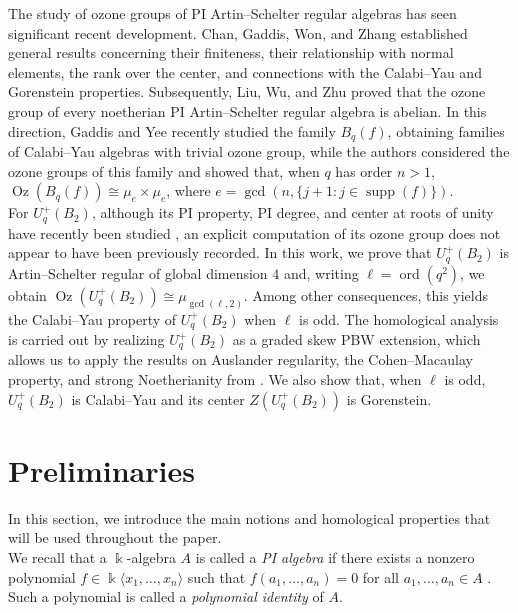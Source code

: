 \documentclass[11pt]{article}
\theoremstyle{definition}
\newcommand{\K}{\Bbbk}
\begin{document}
The study of ozone groups of PI Artin--Schelter regular algebras has seen significant recent development. Chan, Gaddis, Won, and Zhang
\cite{ChanGaddisWonZhang2025} established general results concerning their
finiteness, their relationship with normal elements, the rank over the center,
and connections with the Calabi--Yau and Gorenstein properties. Subsequently,
Liu, Wu, and Zhu \cite{LiuWuZhu2026} proved that the ozone group of every
noetherian PI Artin--Schelter regular algebra is abelian. In this direction,
Gaddis and Yee \cite{GaddisYee2026} recently studied the family
\(B_q(f)\), obtaining families of Calabi--Yau algebras with trivial ozone
group, while the authors \cite{GomezVenegas2026} considered the
ozone groups of this family and showed that, when \(q\) has order \(n>1\),
\(\operatorname{Oz}(B_q(f))\cong\mu_e\times\mu_e\), where
\(e=\gcd(n,\{j+1:j\in\operatorname{supp}(f)\})\). \\

For \(U_q^{+}(B_2)\), although its PI property, PI degree, and center at
roots of unity have recently been studied
\cite{BeraMukherjee2026UqB2}, an explicit computation of its ozone group
does not appear to have been previously recorded. In this work, we prove
that \(U_q^{+}(B_2)\) is Artin--Schelter regular of global dimension \(4\)
and, writing \(\ell=\operatorname{ord}(q^2)\), we obtain
\(\operatorname{Oz}(U_q^{+}(B_2))\cong\mu_{\gcd(\ell,2)}\).
Among other consequences, this yields the Calabi--Yau property of
\(U_q^{+}(B_2)\) when \(\ell\) is odd. The homological analysis is carried
out by realizing \(U_q^{+}(B_2)\) as a graded skew PBW extension, which
allows us to apply the results on Auslander regularity, the
Cohen--Macaulay property, and strong Noetherianity from
\cite{LezamaVenegas2017Homological}. We also show that, when \(\ell\) is odd, \(U_q^+(B_2)\) is Calabi--Yau and its center \(Z(U_q^+(B_2))\) is Gorenstein.


\section{Preliminaries}
In this section, we introduce the main notions and homological properties that will be used throughout the paper.\\

We recall that a \(\K\)-algebra \(A\) is called a \emph{PI algebra} if
there exists a nonzero polynomial
\(f\in\K\langle x_1,\ldots,x_n\rangle\) such that
\(f(a_1,\ldots,a_n)=0\) for all \(a_1,\ldots,a_n\in A\)
\cite[\S13.1]{mcconnell}. Such a polynomial is called a
\emph{polynomial identity} of \(A\).
\end{document}

